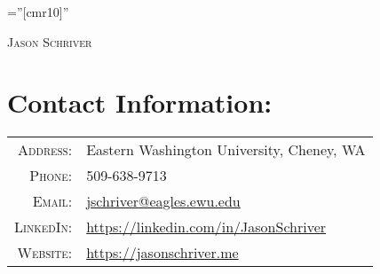 \documentclass[a4paper,10pt]{article}
\begin{document}

\pagestyle{empty} %

\font\fb=''[cmr10]'' %

{\begin{center}
\textsc		{\Large Jason Schriver}
\end{center}}

\section{Contact Information:}
\begin{tabular}{rl}
    \textsc{Address:}   & Eastern Washington University, Cheney, WA \\
    \textsc{Phone:}     & 509-638-9713\\
    \textsc{Email:}     & \href{mailto:jschriver@eagles.ewu.edu}{jschriver@eagles.ewu.edu}\\
    \textsc{LinkedIn:}  & \href{https://linkedin.com/in/JasonSchriver}{https://linkedin.com/in/JasonSchriver}\\
    \textsc{Website:}   & \href{https://jasonschriver.me}{https://jasonschriver.me}
\end{tabular}

\end{document}
